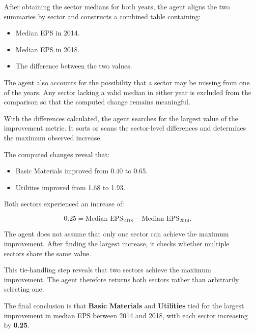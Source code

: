 
After obtaining the sector medians for both years, the agent aligns the two summaries by sector and constructs a combined table containing:

\begin{itemize}
  \item Median EPS in 2014.
  \item Median EPS in 2018.
  \item The difference between the two values.
\end{itemize}

The agent also accounts for the possibility that a sector may be missing from one of the years. Any sector lacking a valid median in either year is excluded from the comparison so that the computed change remains meaningful.


With the differences calculated, the agent searches for the largest value of the improvement metric. It sorts or scans the sector-level differences and determines the maximum observed increase.

The computed changes reveal that:

\begin{itemize}
  \item Basic Materials improved from 0.40 to 0.65.
  \item Utilities improved from 1.68 to 1.93.
\end{itemize}

Both sectors experienced an increase of:

\[
  0.25 = \text{Median EPS}_{2018} - \text{Median EPS}_{2014}.
\]


The agent does not assume that only one sector can achieve the maximum improvement. After finding the largest increase, it checks whether multiple sectors share the same value.

This tie-handling step reveals that two sectors achieve the maximum improvement. The agent therefore returns both sectors rather than arbitrarily selecting one.

The final conclusion is that \textbf{Basic Materials} and \textbf{Utilities} tied for the largest improvement in median EPS between 2014 and 2018, with each sector increasing by \textbf{0.25}.